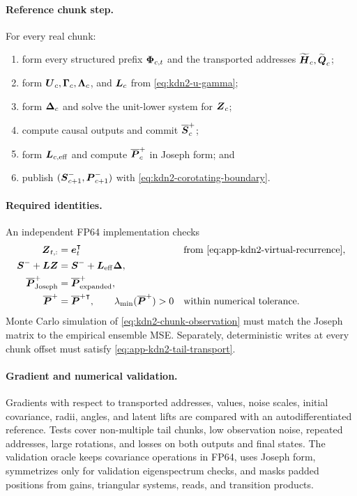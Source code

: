 \documentclass[11pt,letterpaper,logo]{yalearxiv}
\begin{document}
\paragraph{Reference chunk step.}
For every real chunk:
\begin{enumerate}[leftmargin=1.6em,itemsep=2pt,topsep=2pt]
  \item form every structured prefix $\boldsymbol{\Phi}_{c,t}$ and the transported addresses
  $\widetilde{\boldsymbol{H}}_c,\widetilde{\boldsymbol{Q}}_c$;
  \item form $\boldsymbol{U}_c,\boldsymbol{\Gamma}_c,\boldsymbol{\Lambda}_c$, and $\boldsymbol{L}_c$ from
  \eqref{eq:kdn2-u-gamma};
  \item form $\boldsymbol{\Delta}_c$ and solve the unit-lower system for $\boldsymbol{Z}_c$;
  \item compute causal outputs and commit $\overline{\boldsymbol{S}}_c^+$;
  \item form $\boldsymbol{L}_{c,\mathrm{eff}}$ and compute $\overline{\boldsymbol{P}}_c^+$ in Joseph form; and
  \item publish $(\boldsymbol{S}_{c+1}^-,\boldsymbol{P}_{c+1}^-)$ with
  \eqref{eq:kdn2-corotating-boundary}.
\end{enumerate}

\paragraph{Required identities.}
An independent FP64 implementation checks
\begin{equation}
\begin{aligned}
  \boldsymbol{Z}_{t,:}
  &=
  \boldsymbol{e}_{t}^{\intercal}
  &&\text{from \eqref{eq:app-kdn2-virtual-recurrence}},\\
  \boldsymbol{S}^-+\boldsymbol{L}\boldsymbol{Z}
  &=
  \boldsymbol{S}^-+\boldsymbol{L}_{\mathrm{eff}}\boldsymbol{\Delta},\\
  \overline{\boldsymbol{P}}_{\mathrm{Joseph}}^+
  &=
  \overline{\boldsymbol{P}}_{\mathrm{expanded}}^+,\\
  \overline{\boldsymbol{P}}^+
  &=
  \overline{\boldsymbol{P}}^{+\intercal},
  \qquad
  \lambda_{\min}(\overline{\boldsymbol{P}}^+)>0
  &&\text{within numerical tolerance}.
\end{aligned}
\end{equation}
Monte Carlo simulation of \eqref{eq:kdn2-chunk-observation} must match the Joseph matrix to the
empirical ensemble MSE. Separately, deterministic writes at every chunk offset must satisfy
\eqref{eq:app-kdn2-tail-transport}.

\paragraph{Gradient and numerical validation.}
Gradients with respect to transported addresses, values, noise scales, initial covariance,
radii, angles, and latent lifts are compared with an autodifferentiated reference. Tests cover
non-multiple tail chunks, low observation noise, repeated addresses, large rotations, and losses
on both outputs and final states. The validation oracle keeps covariance operations in FP64,
uses Joseph form, symmetrizes only for validation eigenspectrum checks, and masks padded positions
from gains, triangular systems, reads, and transition products.
\end{document}
